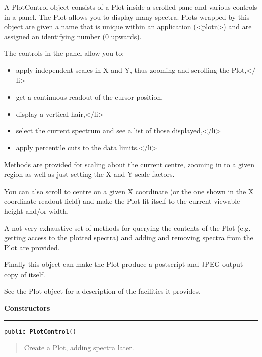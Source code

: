 \documentclass[twoside,11pt,nolof]{starlink}
\providecommand{\method}[1]{\texttt{#1}}
\newenvironment{desc}{\begin{quote}}{\end{quote}}
\providecommand{\constructors}{
   \par\textbf{\large{Constructors}}\\
   \hrule
}
\begin{document}





{A PlotControl object consists of a Plot inside a scrolled pane and
 various controls in a panel. The Plot allows you to display many
 spectra. Plots wrapped by this object are given a name that is
 unique within an application (\textless plotn\textgreater ) and are assigned an
 identifying number (0 upwards).

 The controls in the panel allow you to:
 \begin{itemize}
 \item{ apply independent scales in X and Y, thus zooming and
        scrolling the Plot,\textless $/$li\textgreater
 }
   \item{  get a continuous readout of the cursor position,
   }
\item{  display a vertical hair,\textless $/$li\textgreater
   }
\item{  select the current spectrum and see a list of those
        displayed,\textless $/$li\textgreater
   }
\item{  apply percentile cuts to the data limits.\textless $/$li\textgreater
 }
\end{itemize}

 Methods are provided for scaling about the current centre, zooming
 in to a given region as well as just setting the X and Y scale
 factors.

 You can also scroll to centre on a given X coordinate (or the one
 shown in the X coordinate readout field) and make the Plot fit
 itself to the current viewable height and$/$or width.

 A not-very exhaustive set of methods for querying the contents of
 the Plot (e.g. getting access to the plotted spectra) and adding
 and removing spectra from the Plot are provided.

 Finally this object can make the Plot produce a postscript and JPEG
 output copy of itself.

 See the Plot object for a description of the facilities it
 provides.}

\constructors
\method{public \textbf{PlotControl}()\label{l130}\label{l131}}
\begin{desc}Create a Plot, adding spectra later.
\end{desc}
\end{document}
